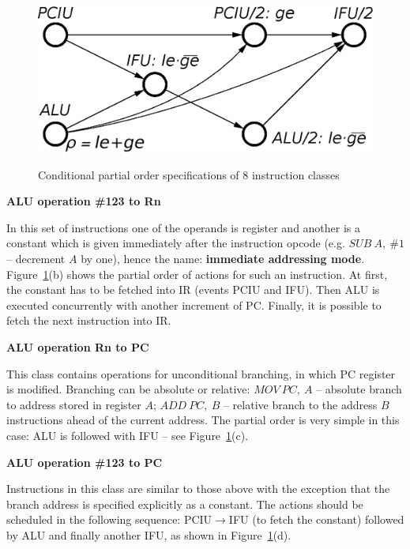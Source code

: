 \begin{figure}
\begin{centering}
{\includegraphics[scale=0.36]{fig/po_CALU_123_PC}}
\par\end{centering}

\caption{Conditional partial order specifications of 8 instruction classes\label{app-fig-Scenarios-of-8}}
\end{figure}


\textbf{ALU operation \#123 to Rn}

In this set of instructions one of the operands is register and another
is a constant which is given immediately after the instruction opcode
(e.g. $\mathit{SUB\ A,\ \#1}$ -- decrement $A$ by one), hence the
name: \textbf{immediate addressing mode}. Figure~\ref{app-fig-Scenarios-of-8}(b)
shows the partial order of actions for such an instruction. At first,
the constant has to be fetched into IR (events PCIU and IFU). Then
ALU is executed concurrently with another increment of PC. Finally,
it is possible to fetch the next instruction into IR.

\textbf{ALU operation Rn to PC}

This class contains operations for unconditional branching, in which
PC register is modified. Branching can be absolute or relative: $\mathit{MOV\ PC,\ A}$
-- absolute branch to address stored in register $A$; $\mathit{ADD\ PC,\ B}$
-- relative branch to the address $B$ instructions ahead of the current
address. The partial order is very simple in this case: ALU is followed
with IFU -- see Figure~\ref{app-fig-Scenarios-of-8}(c).

\textbf{ALU operation \#123 to PC}

Instructions in this class are similar to those above with the exception
that the branch address is specified explicitly as a constant. The
actions should be scheduled in the following sequence: PCIU$\rightarrow$IFU
(to fetch the constant) followed by ALU and finally another IFU, as
shown in Figure~\ref{app-fig-Scenarios-of-8}(d).

